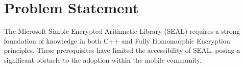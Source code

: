 \section{Problem Statement}
The Microsoft Simple Encrypted Arithmetic Library (SEAL) \cite{sealcrypto} requires a strong foundation of knowledge in both C++ and Fully Homomorphic Encryption principles. These prerequisites have limited the accessibility of SEAL, posing a significant obstacle to the adoption within the mobile community.
